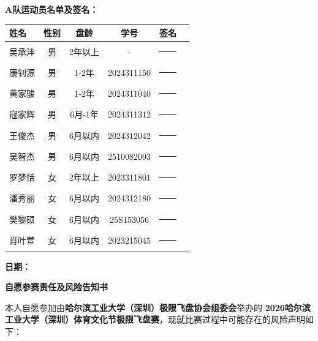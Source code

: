\documentclass{article}
\begin{document}
\vspace{0.2cm} %

\noindent \textbf{A队运动员名单及签名：} \\
\begin{center}
\small %
\renewcommand{\arraystretch}{1.5} %
\begin{tabular}{lccccl} %
    \toprule %
    \textbf{姓名} & \textbf{性别} & \textbf{盘龄} & \textbf{学号} & \textbf{签名} \\[3pt] %
    \midrule
    吴承沣 & 男 & 2年以上 & - & \rule{3cm}{0.4pt} \\
    康钊源 & 男 & 1-2年 & 2024311150 & \rule{3cm}{0.4pt} \\
    黄家骏 & 男 & 1-2年 & 2024311040 & \rule{3cm}{0.4pt} \\
    寇家辉 & 男 & 6月-1年 & 2024311312 & \rule{3cm}{0.4pt} \\
    王俊杰 & 男 & 6月以内 & 2024312042 & \rule{3cm}{0.4pt} \\
    吴智杰 & 男 & 6月以内 & 2510082093 & \rule{3cm}{0.4pt} \\
    罗梦恬 & 女 & 2年以上 & 2023311801 & \rule{3cm}{0.4pt} \\
    潘秀丽 & 女 & 6月以内 & 2024312180 & \rule{3cm}{0.4pt} \\
    樊黎硕 & 女 & 6月以内 & 25S153056 & \rule{3cm}{0.4pt} \\
    肖叶萱 & 女 & 6月以内 & 2023215045 & \rule{3cm}{0.4pt} \\
    \bottomrule %
\end{tabular}
\end{center}

\vspace{0.5cm} %
\noindent \textbf{日期：}

\newpage

\begin{center}
    \vspace*{0cm} %
    {\fontsize{18pt}{28pt}\selectfont\textbf{自愿参赛责任及风险告知书}} %
    \vspace{0.5cm} %
\end{center}

本人自愿参加由\textbf{哈尔滨工业大学（深圳）极限飞盘协会组委会}举办的 \textbf{2026哈尔滨工业大学（深圳）体育文化节极限飞盘赛}，现就比赛过程中可能存在的风险声明如下：
\end{document}
